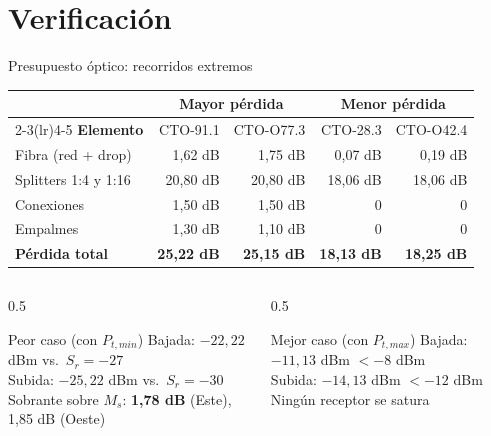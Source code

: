 \section[P2: Verificación]{Verificación}
\begin{frame}{Presupuesto óptico: recorridos extremos}
  \scriptsize
  \begin{tabular}{lrrrr}
    \toprule
    & \multicolumn{2}{c}{\textbf{Mayor pérdida}} & \multicolumn{2}{c}{\textbf{Menor pérdida}} \\
    \cmidrule(lr){2-3}\cmidrule(lr){4-5}
    \textbf{Elemento} & CTO-91.1 & CTO-O77.3 & CTO-28.3 & CTO-O42.4 \\
    \midrule
    Fibra (red + drop) & 1,62 dB & 1,75 dB & 0,07 dB & 0,19 dB \\
    Splitters 1:4 y 1:16 & 20,80 dB & 20,80 dB & 18,06 dB & 18,06 dB \\
    Conexiones & 1,50 dB & 1,50 dB & 0 & 0 \\
    Empalmes & 1,30 dB & 1,10 dB & 0 & 0 \\
    \midrule
    \textbf{Pérdida total} & \textbf{25,22 dB} & \textbf{25,15 dB} & \textbf{18,13 dB} & \textbf{18,25 dB} \\
    \bottomrule
  \end{tabular}
  \vspace{0.2cm}

  \small
  \begin{columns}[T]
    \begin{column}{0.5\textwidth}
      \begin{block}{Peor caso (con $P_{t,min}$)}
        Bajada: $-22{,}22$ dBm vs.\ $S_r = -27$\\
        Subida: $-25{,}22$ dBm vs.\ $S_r = -30$\\
        Sobrante sobre $M_s$: \textbf{1,78 dB} (Este), 1,85 dB (Oeste)
      \end{block}
    \end{column}
    \begin{column}{0.5\textwidth}
      \begin{block}{Mejor caso (con $P_{t,max}$)}
        Bajada: $-11{,}13$ dBm $< -8$ dBm\\
        Subida: $-14{,}13$ dBm $< -12$ dBm\\
        Ningún receptor se satura
      \end{block}
    \end{column}
  \end{columns}
\end{frame}

